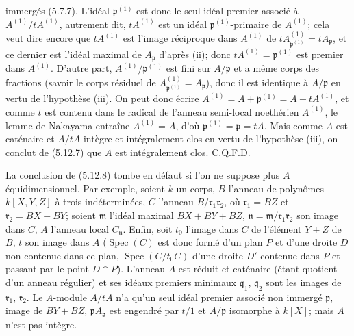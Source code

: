 
immergés (5.7.7). L'idéal $\mathfrak p^{(1)}$ est donc le seul idéal premier
associé à $A^{(1)}/tA^{(1)}$, autrement dit, $tA^{(1)}$ est un idéal
$\mathfrak p^{(1)}$-primaire de $A^{(1)}$; cela veut dire encore que
$tA^{(1)}$ est l'image réciproque dans $A^{(1)}$ de
$tA^{(1)}_{\mathfrak p^{(1)}}=tA_{\mathfrak p}$, et ce dernier est l'idéal
maximal de $A_{\mathfrak p}$ d'après (ii); donc
$tA^{(1)}=\mathfrak p^{(1)}$ est premier dans $A^{(1)}$. D'autre part,
$A^{(1)}/\mathfrak p^{(1)}$ est fini sur $A/\mathfrak p$ et a même corps des
fractions (savoir le corps résiduel de
$A^{(1)}_{\mathfrak p^{(1)}}=A_{\mathfrak p}$), donc il est identique à
$A/\mathfrak p$ en vertu de l'hypothèse (iii). On peut donc écrire
$A^{(1)}=A+\mathfrak p^{(1)}=A+tA^{(1)}$, et comme $t$ est contenu dans le
radical de l'anneau semi-local noethérien $A^{(1)}$, le lemme de Nakayama
entraîne $A^{(1)}=A$, d'où $\mathfrak p^{(1)}=\mathfrak p=tA$. Mais comme $A$
est caténaire et $A/tA$ intègre et intégralement clos en vertu de l'hypothèse
(iii), on conclut de (5.12.7) que $A$ est intégralement clos. C.Q.F.D.

\begin{remark}[5.12.9]
\label{IV.2.s5.12.9-fr}
La conclusion de (5.12.8) tombe en défaut si l'on ne suppose plus $A$
équidimensionnel. Par exemple, soient $k$ un corps, $B$ l'anneau de polynômes
$k[X,Y,Z]$ à trois indéterminées, $C$ l'anneau
$B/\mathfrak r_1\mathfrak r_2$, où $\mathfrak r_1=BZ$ et
$\mathfrak r_2=BX+BY$; soient $\mathfrak m$ l'idéal maximal $BX+BY+BZ$,
$\mathfrak n=\mathfrak m/\mathfrak r_1\mathfrak r_2$ son image dans $C$, $A$
l'anneau local $C_{\mathfrak n}$. Enfin, soit $t_0$ l'image dans $C$ de
l'élément $Y+Z$ de $B$, $t$ son image dans $A$
($\operatorname{Spec}(C)$ est donc formé d'un plan $P$ et d'une droite $D$ non
contenue dans ce plan, $\operatorname{Spec}(C/t_0C)$ d'une droite $D'$ contenue
dans $P$ et passant par le point $D\cap P$). L'anneau $A$ est réduit et
caténaire (étant quotient d'un anneau régulier) et ses idéaux premiers minimaux
$\mathfrak q_1$, $\mathfrak q_2$ sont les images de $\mathfrak r_1$,
$\mathfrak r_2$. Le $A$-module $A/tA$ n'a qu'un seul idéal premier associé non
immergé $\mathfrak p$, image de $BY+BZ$, $\mathfrak pA_{\mathfrak p}$ est
engendré par $t/1$ et $A/\mathfrak p$ isomorphe à $k[X]$; mais $A$ n'est pas
intègre.
\end{remark}


